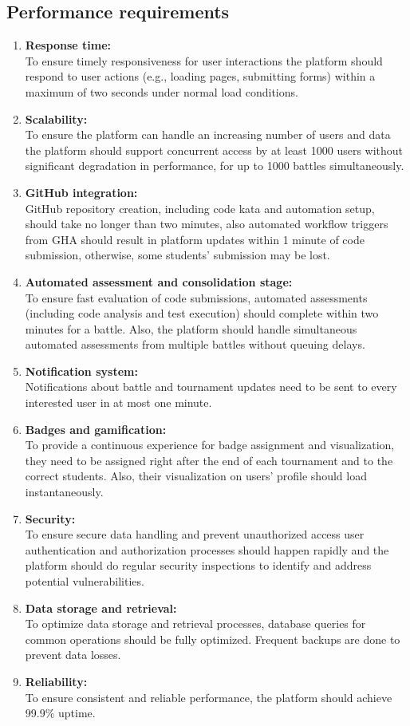 \subsection{Performance requirements}
\begin{enumerate}
  \item \textbf{Response time:} \\
  To ensure timely responsiveness for user interactions the platform should respond to user actions (e.g., loading pages, submitting forms) within a maximum of two seconds under normal load conditions.
  \item \textbf{Scalability:} \\
  To ensure the platform can handle an increasing number of users and data the platform should support concurrent access by at least 1000 users without significant degradation in performance, for up to 1000 battles simultaneously.
  \item \textbf{GitHub integration:} \\
  GitHub repository creation, including code kata and automation setup, should take no longer than two minutes, also automated workflow triggers from GHA should result in platform updates within 1 minute of code submission, otherwise, some students’ submission may be lost.
  \item \textbf{Automated assessment and consolidation stage:} \\
  To ensure fast evaluation of code submissions, automated assessments (including code analysis and test execution) should complete within two minutes for a battle. Also, the platform should handle simultaneous automated assessments from multiple battles without queuing delays.
  \item \textbf{Notification system:} \\
  Notifications about battle and tournament updates need to be sent to every interested user in at most one minute.
  \item \textbf{Badges and gamification:} \\
  To provide a continuous experience for badge assignment and visualization, they need to be assigned right after the end of each tournament and to the correct students. Also, their visualization on users’ profile should load instantaneously.
  \item \textbf{Security:} \\
  To ensure secure data handling and prevent unauthorized access user authentication and authorization processes should happen rapidly and the platform should do regular security inspections to identify and address potential vulnerabilities.
  \item \textbf{Data storage and retrieval:} \\
  To optimize data storage and retrieval processes, database queries for common operations should be fully optimized. Frequent backups are done to prevent data losses.
  \item \textbf{Reliability:} \\
  To ensure consistent and reliable performance, the platform should achieve 99.9\% uptime.
\end{enumerate}
